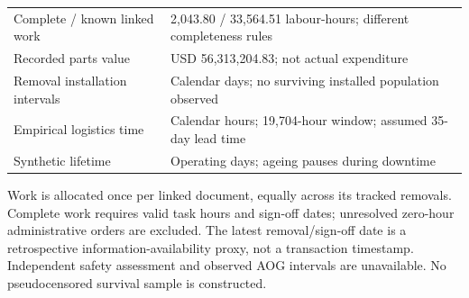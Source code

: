 \begin{small}
\begin{longtable}{p{6cm}p{9cm}}
Complete / known linked work & 2,043.80 / 33,564.51 labour-hours; different completeness rules \\

Recorded parts value & USD 56,313,204.83; not actual expenditure \\

Removal installation intervals & Calendar days; no surviving installed population observed \\

Empirical logistics time & Calendar hours; 19,704-hour window; assumed 35-day lead time \\

Synthetic lifetime & Operating days; ageing pauses during downtime \\

\bottomrule

\end{longtable}

\end{small}

Work is allocated once per linked document, equally across its tracked removals. Complete work requires valid task hours and sign-off dates; unresolved zero-hour administrative orders are excluded. The latest removal/sign-off date is a retrospective information-availability proxy, not a transaction timestamp. Independent safety assessment and observed AOG intervals are unavailable. No pseudocensored survival sample is constructed.

